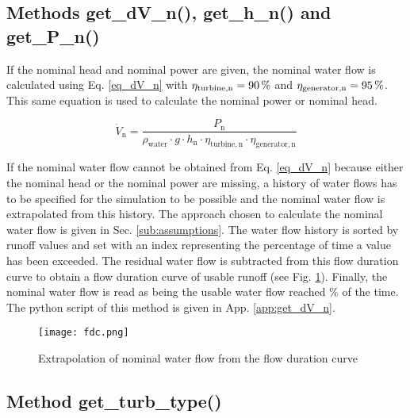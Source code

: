 \subsection{Methods get{\_}dV{\_}n(), get{\_}h{\_}n() and get{\_}P{\_}n()}

If the nominal head and nominal power are given, the nominal water flow is calculated using Eq. \eqref{eq_dV_n} with $\eta_\mathrm{turbine, n} = \unit[90]{\%}$ and $\eta_\mathrm{generator, n} = \unit[95]{\%}$. This same equation is used to calculate the nominal power or nominal head.

\begin{equation}
\label{eq_dV_n} 
 \dot{V}_\mathrm{n}=\frac{ P_\mathrm{n}}{\rho_\mathrm{water} \cdot g  \cdot h_\mathrm{n} \cdot \eta_\mathrm{turbine, n} \cdot \eta_\mathrm{generator, n}}
\end{equation}

If the nominal water flow cannot be obtained from Eq. \eqref{eq_dV_n} because either the nominal head or the nominal power are missing, a history of water flows has to be specified for the simulation to be possible and the nominal water flow is extrapolated from this history. The approach chosen to calculate the nominal water flow is given in Sec. \ref{sub:assumptions}.\newline
The water flow history is sorted by runoff values and set with an index representing the percentage of time a value has been exceeded. The residual water flow is subtracted from this flow duration curve to obtain a flow duration curve of usable runoff (see Fig. \ref{fdc}). Finally, the nominal water flow is read as being the usable water flow reached \unit[20]{\%} of the time. The python script of this method is given in App. \ref{app:get_dV_n}.

\begin{figure}[H]
\centering
\texttt{[image: fdc.png]}
\caption{Extrapolation of nominal water flow from the flow duration curve}
\label{fdc}
\end{figure}

\subsection{Method get{\_}turb{\_}type()}
\label{sub:get_type}

